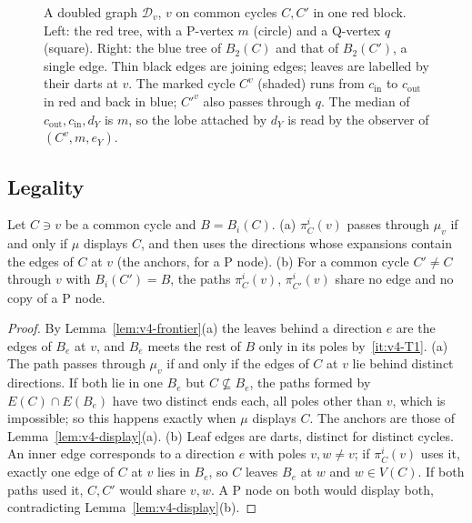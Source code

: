 \begin{figure}[t]
\caption{A doubled graph $\mathcal D_v$, $v$ on common cycles $C,C'$ in one
red block. Left: the red tree, with a P-vertex $m$ (circle) and a Q-vertex
$q$ (square). Right: the blue tree of $B_2(C)$ and that of $B_2(C')$, a
single edge. Thin black edges are joining edges; leaves are labelled by
their darts at $v$. The marked cycle $C^v$ (shaded) runs from $c_{\mathrm{in}}$
to $c_{\mathrm{out}}$ in red and back in blue; $C'^v$ also passes through $q$.
The median of $c_{\mathrm{out}},c_{\mathrm{in}},d_Y$ is $m$, so the lobe
attached by $d_Y$ is read by the observer of $(C^v,m,e_Y)$.}
\label{fig:v4-doubled}
\end{figure}

\subsection{Legality}\label{sec:v4-cmp-legal}

\begin{lemma}\label{lem:v4-anchorpaths}
Let $C\ni v$ be a common cycle and $B=B_i(C)$. (a) $\pi^i_C(v)$ passes through
$\mu_v$ if and only if $\mu$ displays $C$, and then uses the directions whose
expansions contain the edges of $C$ at $v$ (the anchors, for a P node).
(b) For a common cycle $C'\ne C$ through $v$ with $B_i(C')=B$, the paths
$\pi^i_C(v)$, $\pi^i_{C'}(v)$ share no edge and no copy of a P node.
\end{lemma}

\begin{proof}
By Lemma~\ref{lem:v4-frontier}(a) the leaves behind a direction $e$ are the
edges of $B_e$ at $v$, and $B_e$ meets the rest of $B$ only in its poles
by~\ref{it:v4-T1}. (a) The path passes through $\mu_v$ if and only if the
edges of $C$ at $v$ lie behind distinct directions. If both lie in one $B_e$
but $C\not\subseteq B_e$, the paths formed by $E(C)\cap E(B_e)$ have two
distinct ends each, all poles other than $v$, which is impossible; so this
happens exactly when $\mu$ displays $C$. The anchors are those of
Lemma~\ref{lem:v4-display}(a). (b) Leaf edges are darts, distinct for
distinct cycles. An inner edge corresponds to a direction $e$ with poles
$v,w\ne v$; if $\pi^i_C(v)$ uses it, exactly one edge of $C$ at $v$ lies in
$B_e$, so $C$ leaves $B_e$ at $w$ and $w\in V(C)$. If both paths used it, $C,C'$
would share $v,w$. A P node on both would display both,
contradicting Lemma~\ref{lem:v4-display}(b).
\end{proof}

